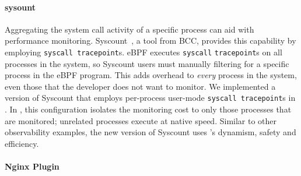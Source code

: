 \paragraph{sysount}

Aggregating the system call activity of a specific process can aid with performance monitoring.  Syscount~\cite{syscount}, a tool from BCC, provides this capability by employing \texttt{syscall tracepoint}s.  eBPF executes \texttt{syscall} \texttt{tracepoint}s on all processes in the system, so Syscount users must manually filtering for a specific process in the eBPF program.  This adds overhead to \emph{every} process in the system, even those that the developer does not want to monitor.  We implemented a version of Syscount that employs per-process user-mode \texttt{syscall tracepoint}s in \sys.  In \sys, this configuration isolates the monitoring cost to only those processes that are monitored; unrelated processes execute at native speed.  Similar to other observability examples, the new version of Syscount uses \sys{}'s dynamism, safety and efficiency.

\paragraph{Nginx Plugin}

